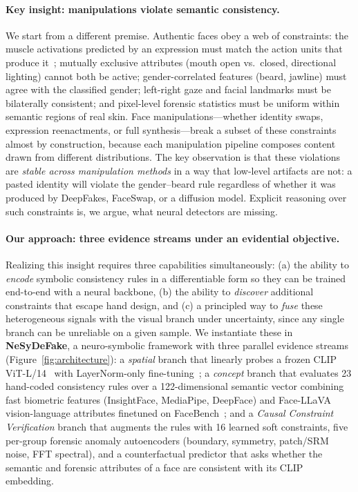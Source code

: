 \documentclass{article}
\begin{document}
\paragraph{Key insight: manipulations violate semantic consistency.}
We start from a different premise. Authentic faces obey a web of constraints: the muscle activations predicted by an expression must match the action units that produce it~\citep{ekman1978facial}; mutually exclusive attributes (mouth open vs.\ closed, directional lighting) cannot both be active; gender-correlated features (beard, jawline) must agree with the classified gender; left-right gaze and facial landmarks must be bilaterally consistent; and pixel-level forensic statistics must be uniform within semantic regions of real skin. Face manipulations---whether identity swaps, expression reenactments, or full synthesis---break a subset of these constraints almost by construction, because each manipulation pipeline composes content drawn from different distributions. The key observation is that these violations are \emph{stable across manipulation methods} in a way that low-level artifacts are not: a pasted identity will violate the gender--beard rule regardless of whether it was produced by DeepFakes, FaceSwap, or a diffusion model. Explicit reasoning over such constraints is, we argue, what neural detectors are missing.

\paragraph{Our approach: three evidence streams under an evidential objective.}
Realizing this insight requires three capabilities simultaneously: (a) the ability to \emph{encode} symbolic consistency rules in a differentiable form so they can be trained end-to-end with a neural backbone, (b) the ability to \emph{discover} additional constraints that escape hand design, and (c) a principled way to \emph{fuse} these heterogeneous signals with the visual branch under uncertainty, since any single branch can be unreliable on a given sample. We instantiate these in \textbf{NeSyDeFake}, a neuro-symbolic framework with three parallel evidence streams (Figure~\ref{fig:architecture}): a \emph{spatial} branch that linearly probes a frozen CLIP ViT-L/14~\citep{radford2021clip} with LayerNorm-only fine-tuning~\citep{gend}; a \emph{concept} branch that evaluates 23 hand-coded consistency rules over a 122-dimensional semantic vector combining fast biometric features (InsightFace, MediaPipe, DeepFace) and Face-LLaVA~\citep{faceLLaVA} vision-language attributes finetuned on FaceBench~\citep{facebench}; and a \emph{Causal Constraint Verification} branch that augments the rules with 16 learned soft constraints, five per-group forensic anomaly autoencoders (boundary, symmetry, patch/SRM noise, FFT spectral), and a counterfactual predictor that asks whether the semantic and forensic attributes of a face are consistent with its CLIP embedding.
\end{document}
